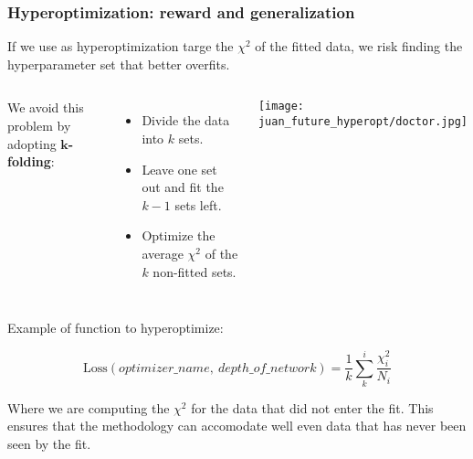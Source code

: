 \begin{frame}
    \frametitle{Hyperoptimization: reward and generalization}
    If we use as hyperoptimization targe the $\chi^{2}$ of the fitted data, we risk finding the hyperparameter set that
    better overfits.


    \vfill

    \begin{columns}
        We avoid this problem by adopting \textbf{$\boldsymbol{k}$-folding}:

        \begin{itemize}
            \item Divide the data into $k$ sets.
            \item Leave one set out and fit the $k-1$ sets left.
            \item Optimize the average $\chi^{2}$ of the $k$ non-fitted sets.
        \end{itemize}
        \texttt{[image: juan\_future\_hyperopt/doctor.jpg]}
    \end{columns}

    \vspace{0.4cm}

    Example of function to hyperoptimize:

    \begin{equation*}
        \text{Loss}(optimizer\_name,\ depth\_of\_network) = \frac{1}{k}\displaystyle\sum^{i}_{k} \frac{\chi^{2}_{i}}{N_{i}}
    \end{equation*}

    Where we are computing the $\chi^{2}$ for the data that did not enter the fit. This ensures that the methodology
    can accomodate well even data that has never been seen by the fit.

\end{frame}
